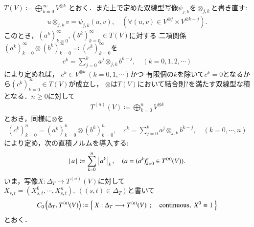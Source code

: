 	$T(V) \coloneqq \bigoplus_{k=0}^{\infty} V^{\otimes k}$
	とおく．また上で定めた双線型写像$\psi_{j,k}$を$\otimes_{j,k}$と書き直す:
	\begin{align}
		u \otimes_{j,k} v = \psi_{j,k}(u,v),
		\quad (\forall (u,v) \in V^{\otimes j} \times V^{\otimes k-j}).
		\label{eq:def_of_otimes_for_completion_V_tensor_k}
	\end{align}
	このとき，$(a^k)_{k=0}^{\infty},(b^k)_{k=0}^{\infty} \in T(V)$に対する
	二項関係$(a^k)_{k=0}^{\infty} \otimes (b^k)_{k=0}^{\infty} \eqqcolon (c^k)_{k=0}^{\infty}$を
	\begin{align}
		c^k = \sum_{j=0}^{k} a^j \otimes_{j,k} b^{k-j},
		\quad (k=0,1,2,\cdots)
	\end{align}
	により定めれば，
	$c^k \in V^{\otimes k}\ (k=0,1,\cdots)$かつ
	有限個の$k$を除いて$c^k = 0$となるから$(c^k)_{k=0}^\infty \in T(V)$が成立し，
	$\otimes$は$T(V)$において結合則?を満たす双線型な積となる．$n \geq 0$に対して
	\begin{align}
		T^{(n)}(V) \coloneqq \bigoplus_{k=0}^{n} V^{\otimes k}
	\end{align}
	とおき，同様に$\otimes$を
	\begin{align}
		(c^k)_{k=0}^n = (a^k)_{k=0}^n \otimes (b^k)_{k=0}^n,
		\quad c^k = \sum_{j=0}^{k} a^j \otimes_{j,k} b^{k-j},
		\quad (k=0,\cdots,n)
	\end{align}
	により定め，次の直積ノルムを導入する:
	\begin{align}
		\left|\, a\, \right|_{} \coloneqq \sum_{k=0}^n \left|\, a^k\, \right|_{k},
		\quad (a = (a^k)_{k=0}^n \in T^{(n)}(V)).
		\label{eq:def_norm_on_truncated_tensor_algebra}
	\end{align}
	いま，写像$X:\Delta_T \longrightarrow T^{(n)}(V)$に対して
	$X_{s,t} = (X^0_{s,t},\cdots,X^n_{s,t}),\ ((s,t) \in \Delta_T)$と書いて
	\begin{align}
		C_0 \left(\Delta_T,T^{(n)}(V) \right)
		\coloneqq \left\{\ X:\Delta_T \longrightarrow T^{(n)}(V)\ \, ; \quad \mbox{continuous},\ X^0 \equiv 1\ \right\}
	\end{align}
	とおく．
	
